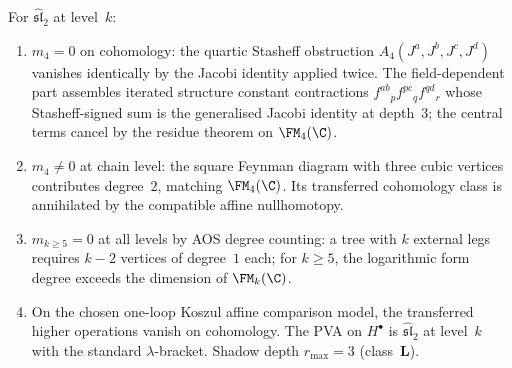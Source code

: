 \begin{proposition}
\label{prop:su2-truncation}
For $\widehat{\mathfrak{sl}}_2$ at level~$k$:
\begin{enumerate}[label=\textup{(\roman*)}]
\item $m_4 = 0$ on cohomology: the quartic Stasheff obstruction
 $A_4(J^a, J^b, J^c, J^d)$ vanishes identically by the Jacobi
 identity applied twice. The field-dependent part assembles
 iterated structure constant contractions
 $f^{ab}{}_p f^{pc}{}_q f^{qd}{}_r$ whose Stasheff-signed sum
 is the generalised Jacobi identity at depth~$3$; the central
 terms cancel by the residue theorem on $\FM_4(\C)$.
\item $m_4 \neq 0$ at chain level: the square Feynman diagram
 with three cubic vertices contributes degree~$2$, matching
 $\FM_4(\C)$. Its transferred cohomology class is annihilated by the
 compatible affine nullhomotopy.
\item $m_{k \geq 5} = 0$ at all levels by AOS degree counting:
 a tree with $k$ external legs requires $k-2$ vertices of
 degree~$1$ each; for $k \geq 5$, the logarithmic form degree
 exceeds the dimension of $\FM_k(\C)$.
\item On the chosen one-loop Koszul affine comparison model, the
 transferred higher operations vanish on cohomology. The PVA on
 $H^\bullet$ is $\widehat{\mathfrak{sl}}_2$ at level~$k$ with the
 standard $\lambda$-bracket. Shadow depth $r_{\max} = 3$
 (class~$\mathbf{L}$).
\end{enumerate}
\end{proposition}

